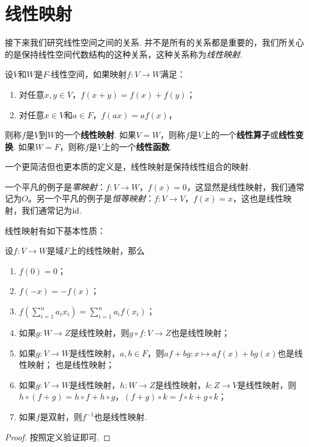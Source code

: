 \section{线性映射}

接下来我们研究线性空间之间的关系. 并不是所有的关系都是重要的，我们所关心的是保持线性空间代数结构的这种关系，这种关系称为\emph{线性映射}. 

\begin{definition}
设$V$和$W$是$F$-线性空间，如果映射$f:V\to W$满足：
\begin{enumerate}
    \item 对任意$x,y\in V$，$f(x+y)=f(x)+f(y)$；
    \item 对任意$x\in V$和$a\in F$，$f(ax)=af(x)$，
\end{enumerate}
则称$f$是$V$到$W$的一个\textbf{线性映射}. 如果$V=W$，则称$f$是$V$上的一个\textbf{线性算子}或\textbf{线性变换}. 如果$W=F$，则称$f$是$V$上的一个\textbf{线性函数}.
\end{definition}

一个更简洁但也更本质的定义是，线性映射是保持线性组合的映射. 

\begin{example}
一个平凡的例子是\emph{零映射}：$f:V\to W$，$f(x)=0$，这显然是线性映射，我们通常记为$O$。另一个平凡的例子是\emph{恒等映射}：$f:V\to V$，$f(x)=x$，这也是线性映射，我们通常记为$\mathrm{id}$.
\end{example}

线性映射有如下基本性质：

\begin{proposition}\label{prop:linear-map-basic}
设$f:V\to W$是域$F$上的线性映射，那么
\begin{enumerate}
    \item $f(0)=0$；
    \item $f(-x)=-f(x)$；
    \item $f(\sum_{i=1}^n a_ix_i)=\sum_{i=1}^n a_if(x_i)$；
    \item 如果$g:W\to Z$是线性映射，则$g\circ f:V\to Z$也是线性映射；
    \item 如果$g:V\to W$是线性映射，$a,b\in F$，则$af+bg:x\mapsto af(x)+bg(x)$也是线性映射；
    也是线性映射；
    \item 如果$g:V\to W$是线性映射，$h:W\to Z$是线性映射，$k:Z\to V$是线性映射，则$h\circ(f+g)=h\circ f+h\circ g$，$(f+g)\circ k = f\circ k+g\circ k$；
    \item 如果$f$是双射，则$f^{-1}$也是线性映射. 
\end{enumerate}
\end{proposition}
\begin{proof}
    按照定义验证即可. 
\end{proof}

